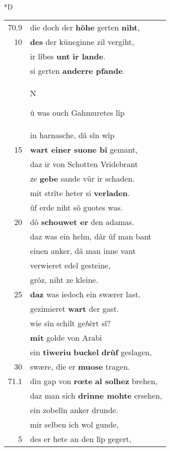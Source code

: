 \documentclass[8pt,a4paper,notitlepage]{article}
\begin{document}
\begin{table}[ht]
\begin{minipage}[t]{0.5\linewidth}
\small
\begin{center}*D
\end{center}
\begin{tabular}{rl}
70.9 & die doch der \textbf{hôhe} gerten \textbf{niht},\\ 
10 & \textbf{des} der küneginne zil vergiht,\\ 
 & ir lîbes \textbf{unt} \textbf{ir lande}.\\ 
 & si gerten \textbf{anderre pfande}.\\ 
 & \begin{large}N\end{large}û was ouch Gahmuretes lîp\\ 
 & in harnasche, dâ sîn wîp\\ 
15 & \textbf{wart einer suone bî} gemant,\\ 
 & daz ir von Schotten Vridebrant\\ 
 & ze \textbf{gebe} sande vür ir schaden.\\ 
 & mit strîte heter si \textbf{verladen}.\\ 
 & ûf erde niht sô guotes was.\\ 
20 & dô \textbf{schouwet er} den adamas.\\ 
 & daz was ein helm, dâr ûf man bant\\ 
 & einen anker, dâ man inne vant\\ 
 & verwieret edel gesteine,\\ 
 & grôz, niht ze kleine.\\ 
25 & \textbf{daz} was iedoch ein swærer last.\\ 
 & gezimieret \textbf{wart} der gast.\\ 
 & wie sîn schilt ge\textit{h}êrt sî?\\ 
 & \textbf{mit} golde von Arabi\\ 
 & ein \textbf{tiweriu} \textbf{buckel} \textbf{drûf} geslagen,\\ 
30 & swære, die er \textbf{muose} tragen.\\ 
71.1 & diu gap von \textbf{rœte} \textbf{al solhez} brehen,\\ 
 & daz man sich \textbf{drinne mohte} ersehen,\\ 
 & ein zobelîn anker drunde.\\ 
 & mir selben ich wol gunde,\\ 
5 & des er hete an den lîp gegert,\\ 

\end{tabular}
\end{minipage}
\end{table}
\end{document}
